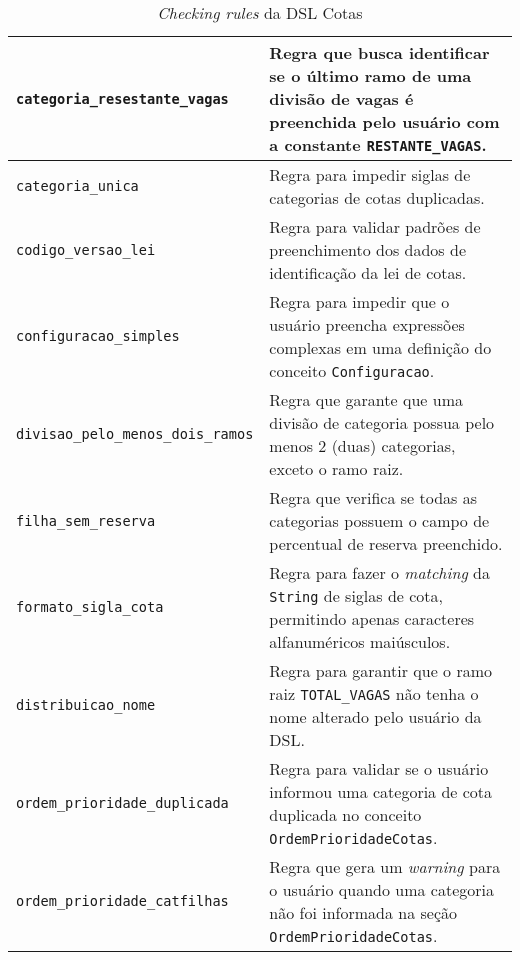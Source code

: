 \begin{table}[ht]
\caption{\textit{Checking rules} da DSL Cotas}
\label{tblcheckingrules}
\centering

\begin{tabular}{|p{6cm}|p{8cm}|}
\hline
\texttt{categoria\_resestante\_vagas} & Regra que busca identificar se o último ramo de uma divisão de vagas é preenchida pelo usuário com a constante \texttt{RESTANTE\_VAGAS}.                                                                                      \\ \hline
\texttt{categoria\_unica} & Regra para impedir siglas de categorias de cotas duplicadas.                         \\ \hline
\texttt{codigo\_versao\_lei}          & Regra para validar padrões de preenchimento dos dados de identificação da lei de cotas.                                       \\ \hline
\texttt{configuracao\_simples}          & Regra para impedir que o usuário preencha expressões complexas em uma definição do conceito \texttt{Configuracao}.
                        \\ \hline
\texttt{divisao\_pelo\_menos\_dois\_ramos}          & Regra que garante que uma divisão de categoria possua pelo menos 2 (duas) categorias, exceto o ramo raiz.
                        \\ \hline
\texttt{filha\_sem\_reserva}          & Regra que verifica se todas as categorias possuem o campo de percentual de reserva preenchido.

\\ \hline
               
\texttt{formato\_sigla\_cota}          & Regra para fazer o \textit{matching} da \texttt{String} de siglas de cota, permitindo apenas caracteres alfanuméricos maiúsculos.
\\ \hline

\texttt{distribuicao\_nome}          & Regra para garantir que o ramo raiz \texttt{TOTAL\_VAGAS} não tenha o nome alterado pelo usuário da DSL.
\\ \hline

\texttt{ordem\_prioridade\_duplicada}          & Regra para validar se o usuário informou uma categoria de cota duplicada no conceito \texttt{OrdemPrioridadeCotas}.
\\ \hline

\texttt{ordem\_prioridade\_catfilhas}          & Regra que gera um \textit{warning} para o usuário quando uma categoria não foi informada na seção \texttt{OrdemPrioridadeCotas}.
\\ \hline


\end{tabular}
\end{table}
